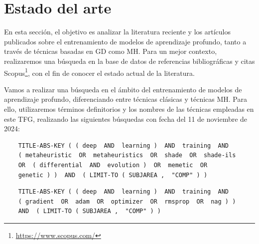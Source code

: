 \section{Estado del arte}

En esta sección, el objetivo es analizar la literatura reciente y los artículos publicados sobre el entrenamiento de modelos de aprendizaje profundo, tanto a través de técnicas basadas en GD como MH. Para un mejor contexto, realizaremos una búsqueda en la base de datos de referencias bibliográficas y citas Scopus\footnote{\url{https://www.scopus.com/}}, con el fin de conocer el estado actual de la literatura. 



Vamos a realizar una búsqueda en el ámbito del entrenamiento de modelos de aprendizaje profundo, diferenciando entre técnicas clásicas y técnicas MH. Para ello, utilizaremos términos definitorios y los nombres de las técnicas empleadas en este TFG, realizando las siguientes búsquedas con fecha del 11 de noviembre de 2024:

\begin{verbatim}
	TITLE-ABS-KEY ( ( deep  AND  learning )  AND  training  AND 
	( metaheuristic  OR  metaheuristics  OR  shade  OR  shade-ils 
	OR  ( differential  AND  evolution )  OR  memetic  OR 
	genetic ) )  AND  ( LIMIT-TO ( SUBJAREA ,  "COMP" ) )

\end{verbatim}

\begin{verbatim}
	TITLE-ABS-KEY ( ( deep  AND  learning )  AND  training  AND 
	( gradient  OR  adam  OR  optimizer  OR  rmsprop  OR  nag ) )  
	AND  ( LIMIT-TO ( SUBJAREA ,  "COMP" ) ) 
\end{verbatim}

